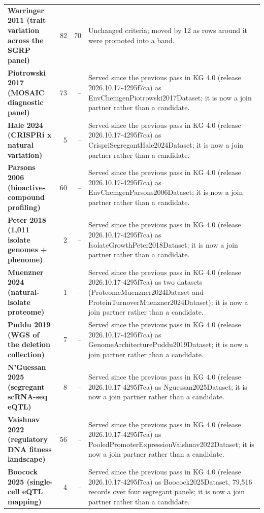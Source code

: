 \begin{longtable}{@{}L{46mm} r@{\hspace{6pt}} r@{\hspace{6pt}} L{104mm}@{}}
\addlinespace[5pt]
\textbf{Warringer 2011 (trait variation across the SGRP panel)} & 82 & 70 & Unchanged criteria; moved by 12 as rows around it were promoted into a band. \\
\addlinespace[5pt]
\textbf{Piotrowski 2017 (MOSAIC diagnostic panel)} & 73 & -- & Served since the previous pass in KG 4.0 (release 2026.10.17-4295f7ca) as EnvChemgenPiotrowski2017Dataset; it is now a join partner rather than a candidate. \\
\addlinespace[5pt]
\textbf{Hale 2024 (CRISPRi x natural variation)} & 5 & -- & Served since the previous pass in KG 4.0 (release 2026.10.17-4295f7ca) as CrispriSegregantHale2024Dataset; it is now a join partner rather than a candidate. \\
\addlinespace[5pt]
\textbf{Parsons 2006 (bioactive-compound profiling)} & 60 & -- & Served since the previous pass in KG 4.0 (release 2026.10.17-4295f7ca) as EnvChemgenParsons2006Dataset; it is now a join partner rather than a candidate. \\
\addlinespace[5pt]
\textbf{Peter 2018 (1,011 isolate genomes + phenome)} & 2 & -- & Served since the previous pass in KG 4.0 (release 2026.10.17-4295f7ca) as IsolateGrowthPeter2018Dataset; it is now a join partner rather than a candidate. \\
\addlinespace[5pt]
\textbf{Muenzner 2024 (natural-isolate proteome)} & 1 & -- & Served since the previous pass in KG 4.0 (release 2026.10.17-4295f7ca) as two datasets (ProteomeMuenzner2024Dataset and ProteinTurnoverMuenzner2024Dataset); it is now a join partner rather than a candidate. \\
\addlinespace[5pt]
\textbf{Puddu 2019 (WGS of the deletion collection)} & 7 & -- & Served since the previous pass in KG 4.0 (release 2026.10.17-4295f7ca) as GenomeArchitecturePuddu2019Dataset; it is now a join partner rather than a candidate. \\
\addlinespace[5pt]
\textbf{N'Guessan 2025 (segregant scRNA-seq eQTL)} & 8 & -- & Served since the previous pass in KG 4.0 (release 2026.10.17-4295f7ca) as Nguessan2025Dataset; it is now a join partner rather than a candidate. \\
\addlinespace[5pt]
\textbf{Vaishnav 2022 (regulatory DNA fitness landscape)} & 56 & -- & Served since the previous pass in KG 4.0 (release 2026.10.17-4295f7ca) as PooledPromoterExpressionVaishnav2022Dataset; it is now a join partner rather than a candidate. \\
\addlinespace[5pt]
\textbf{Boocock 2025 (single-cell eQTL mapping)} & 4 & -- & Served since the previous pass in KG 4.0 (release 2026.10.17-4295f7ca) as Boocock2025Dataset, 79,516 records over four segregant panels; it is now a join partner rather than a candidate. \\

\end{longtable}
